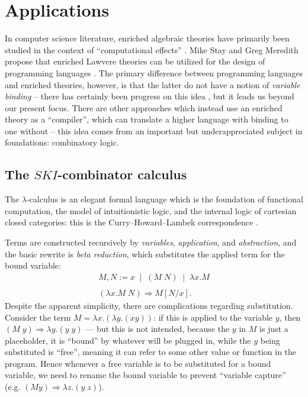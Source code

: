 \documentclass{amsart}
\theoremstyle{definition}
\begin{document}
\section{Applications}
\label{sec:applications}

In computer science literature, enriched algebraic theories have primarily been studied in the context of ``computational effects'' \cite{compeffects}. Mike Stay and Greg Meredith propose that enriched Lawvere theories can be utilized for the design of programming languages \cite{ladl}. The primary difference between programming languages and enriched theories, however, is that the latter do not have a notion of \textit{variable binding} -- there has certainly been progress on this idea \cite{fiore}, but it leads us beyond our present focus. There are other approaches which instead use an enriched theory as a ``compiler'', which can translate a higher language with binding to one without -- this idea comes from an important but underappreciated subject in foundations: combinatory logic.

\subsection{The $SKI$-combinator calculus}
\label{ssec:SKI}

The $\lambda$-calculus is an elegant formal language which is the foundation of functional computation, the model of intuitionistic logic, and the internal logic of cartesian closed categories: this is the Curry--Howard--Lambek correspondence \cite{baezstay}.

Terms are constructed recursively by \textit{variables}, \textit{application}, and \textit{abstraction}, and the basic rewrite is \textit{beta reduction}, which substitutes the applied term for the bound variable: 
\[ \begin{array}{l}
     M,N := x \;\; | \;\; (M\; N) \;\; | \;\; \lambda x.M\\\\
     (\lambda x.M\; N) \Rightarrow M[N/x].
     \end{array}\]
Despite the apparent simplicity, there are complications regarding substitution. Consider the term $M = \lambda x.(\lambda y.(xy))$: if this is applied to the variable $y$, then $(M\; y) \Rightarrow \lambda y.(y\; y)$ --- but this is not intended, because the $y$ in $M$ is just a placeholder, it is ``bound'' by whatever will be plugged in, while the $y$ being substituted is ``free'', meaning it can refer to some other value or function in the program. Hence whenever a free variable is to be substituted for a bound variable, we need to rename the bound variable to prevent ``variable capture'' (e.g. $(M y) \Rightarrow \lambda z.(y\; z)$).
\end{document}
